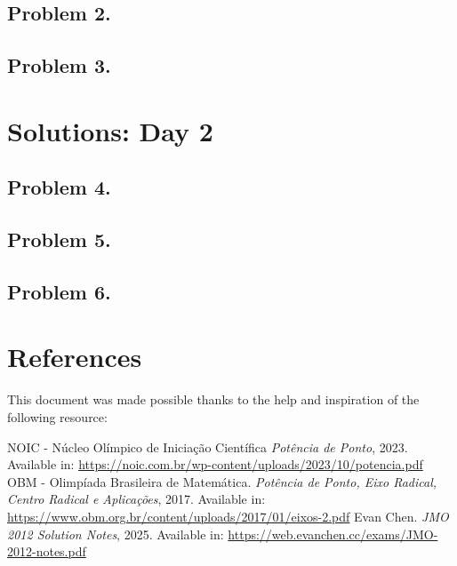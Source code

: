 \documentclass[12pt]{artilcle}
\begin{document}
    \clearpage
    \subsection{Problem 2.}
    \clearpage
    \subsection{Problem 3.}
    \clearpage

  \section{\textsf{Solutions: Day 2}}
    \subsection{Problem 4.}
    \clearpage
    \subsection{Problem 5.}
    \clearpage
    \subsection{Problem 6.}
    \clearpage

    \section{\textsf{References}}
    This document was made possible thanks to the help and inspiration of the following resource:
    \renewcommand{\refname}{\vspace{-2em}}
    \begin{thebibliography}{9}
      NOIC - Núcleo Olímpico de Iniciação Científica
      \textit{Potência de Ponto}, 2023.
      Available in: \url{https://noic.com.br/wp-content/uploads/2023/10/potencia.pdf}
      OBM - Olimpíada Brasileira de Matemática.
      \textit{Potência de Ponto, Eixo Radical, Centro Radical e Aplicações}, 2017.
      Available in: \url{https://www.obm.org.br/content/uploads/2017/01/eixos-2.pdf}
      Evan Chen.
      \textit{JMO 2012 Solution Notes}, 2025.
      Available in: \url{https://web.evanchen.cc/exams/JMO-2012-notes.pdf}
    \end{thebibliography}
\end{document}
